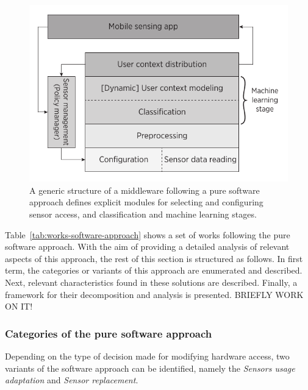 \documentclass[ENG,PhD]{cinvestav}
\begin{document}
\begin{figure}
  \centering
  \includegraphics[width=0.5\columnwidth]{generic-middleware-architecture}
  \caption{A generic structure of a middleware following a pure software approach defines explicit modules for selecting and configuring sensor access, and classification and machine learning stages.}
  \label{fig:middleware-software-approach}
\end{figure}



Table~\ref{tab:works-software-approach} shows a set of works following the pure software approach.
With the aim of providing a detailed analysis of relevant aspects of this approach, the rest of this section is structured as follows.
In first term, the categories or variants of this approach are enumerated and described.
Next, relevant characteristics found in these solutions are described.
Finally, a framework for their decomposition and analysis is presented.
BRIEFLY WORK ON IT!

\subsubsection{Categories of the pure software approach}
\label{sub:software-categories}
Depending on the type of decision made for modifying hardware access, two variants of the software approach can be identified, namely the \emph{Sensors usage adaptation} and \emph{Sensor replacement}.


\end{document}
